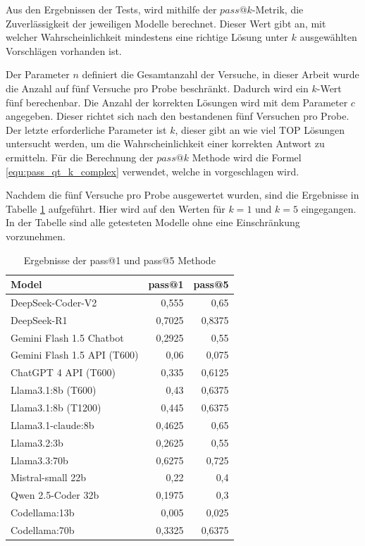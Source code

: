 Aus den Ergebnissen der Tests, wird mithilfe der $pass@k$-Metrik, die Zuverlässigkeit der jeweiligen Modelle berechnet. Dieser Wert gibt an, mit welcher Wahrscheinlichkeit mindestens eine richtige Lösung unter $k$ ausgewählten Vorschlägen vorhanden ist.\vspace{0.2cm}

Der Parameter $n$ definiert die Gesamtanzahl der Versuche, in dieser Arbeit wurde die Anzahl auf fünf Versuche pro Probe beschränkt. Dadurch wird ein $k$-Wert fünf berechenbar. Die Anzahl der korrekten Lösungen wird mit dem Parameter $c$ angegeben. Dieser richtet sich nach den bestandenen fünf Versuchen pro Probe. Der letzte erforderliche Parameter ist $k$, dieser gibt an wie viel TOP Lösungen untersucht werden, um die Wahrscheinlichkeit einer korrekten Antwort zu ermitteln. Für die Berechnung der $pass@k$ Methode wird die Formel \ref{equ:pass_qt_k_complex} verwendet, welche in \cite{chen-2021} vorgeschlagen wird.\vspace{0.2cm}

Nachdem die fünf Versuche pro Probe ausgewertet wurden, sind die Ergebnisse in Tabelle \ref{tab:prompt_results_open_models} aufgeführt. Hier wird auf den Werten für $k=1$ und $k=5$ eingegangen. In der Tabelle sind alle getesteten Modelle ohne eine Einschränkung vorzunehmen.\vspace{0.2cm}

\begin{table}[!ht]
	\begin{tabular}{|l|r|r|}
		\hline
		\textbf{Model} & \textbf{pass@1} & \textbf{pass@5} \\
		\hline
		DeepSeek-Coder-V2           &  0,555 &     0,65 \\
		DeepSeek-R1                 & 0,7025 &   0,8375 \\
		Gemini Flash 1.5 Chatbot    & 0,2925 &     0,55 \\
		Gemini Flash 1.5 API (T600) &   0,06 &    0,075 \\
		ChatGPT 4 API (T600)        &  0,335 &   0,6125 \\
		Llama3.1:8b (T600)          &   0,43 &   0,6375 \\
		Llama3.1:8b (T1200)         &  0,445 &   0,6375 \\
		Llama3.1-claude:8b          & 0,4625 &     0,65 \\
		Llama3.2:3b                 & 0,2625 &     0,55 \\
		Llama3.3:70b                & 0,6275 &    0,725 \\
		Mistral-small 22b           &   0,22 &      0,4 \\
		Qwen 2.5-Coder 32b          & 0,1975 &      0,3 \\
		Codellama:13b               &  0,005 &    0,025 \\
		Codellama:70b               & 0,3325 &   0,6375 \\
		\hline
		\hline
	\end{tabular}
	\centering
	\label{tab:prompt_results_open_models}
	\caption{Ergebnisse der pass@1 und pass@5 Methode}
\end{table}

